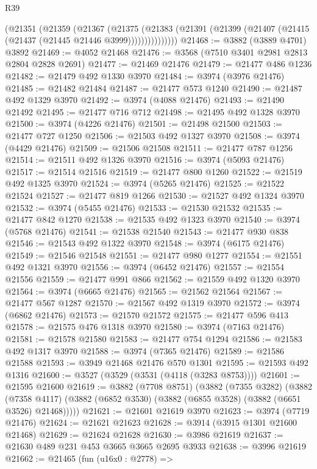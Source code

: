 \begin{lexlean}{R39}
\begin{coremodule}
            (@21351
              (@21359
                (@21367
                  (@21375
                    (@21383
                      (@21391 (@21399 (@21407 (@21415 (@21437 (@21445 @21446 @3999)))))))))))))))
@21468 := @3882 (@3889 @4701) @3892
@21469 := @4052 @21468
@21476 := @3568 (@7510 @3401 @2981 @2813 @2804 @2828 @2691)
@21477 := @21469 @21476
@21479 := @21477 @486 @1236
@21482 := @21479 @492 @1330 @3970
@21484 := @3974 (@3976 @21476)
@21485 := @21482 @21484
@21487 := @21477 @573 @1240
@21490 := @21487 @492 @1329 @3970
@21492 := @3974 (@4088 @21476)
@21493 := @21490 @21492
@21495 := @21477 @716 @712
@21498 := @21495 @492 @1328 @3970
@21500 := @3974 (@4226 @21476)
@21501 := @21498 @21500
@21503 := @21477 @727 @1250
@21506 := @21503 @492 @1327 @3970
@21508 := @3974 (@4429 @21476)
@21509 := @21506 @21508
@21511 := @21477 @787 @1256
@21514 := @21511 @492 @1326 @3970
@21516 := @3974 (@5093 @21476)
@21517 := @21514 @21516
@21519 := @21477 @800 @1260
@21522 := @21519 @492 @1325 @3970
@21524 := @3974 (@5265 @21476)
@21525 := @21522 @21524
@21527 := @21477 @819 @1266
@21530 := @21527 @492 @1324 @3970
@21532 := @3974 (@5455 @21476)
@21533 := @21530 @21532
@21535 := @21477 @842 @1270
@21538 := @21535 @492 @1323 @3970
@21540 := @3974 (@5768 @21476)
@21541 := @21538 @21540
@21543 := @21477 @930 @838
@21546 := @21543 @492 @1322 @3970
@21548 := @3974 (@6175 @21476)
@21549 := @21546 @21548
@21551 := @21477 @980 @1277
@21554 := @21551 @492 @1321 @3970
@21556 := @3974 (@6452 @21476)
@21557 := @21554 @21556
@21559 := @21477 @991 @866
@21562 := @21559 @492 @1320 @3970
@21564 := @3974 (@6665 @21476)
@21565 := @21562 @21564
@21567 := @21477 @567 @1287
@21570 := @21567 @492 @1319 @3970
@21572 := @3974 (@6862 @21476)
@21573 := @21570 @21572
@21575 := @21477 @596 @413
@21578 := @21575 @476 @1318 @3970
@21580 := @3974 (@7163 @21476)
@21581 := @21578 @21580
@21583 := @21477 @754 @1294
@21586 := @21583 @492 @1317 @3970
@21588 := @3974 (@7365 @21476)
@21589 := @21586 @21588
@21593 := @3949 @21468 @21476 @570 @1301
@21595 := @21593 @492 @1316
@21600 := @3527 (@3529 (@3531 (@4118 (@3283 @8753))))
@21601 := @21595 @21600
@21619 := @3882
    (@7708 @8751)
    (@3882
      (@7355 @3282)
      (@3882
        (@7358 @4117)
        (@3882 (@6852 @3530) (@3882 (@6855 @3528) (@3882 (@6651 @3526) @21468)))))
@21621 := @21601 @21619 @3970
@21623 := @3974 (@7719 @21476)
@21624 := @21621 @21623
@21628 := @3914 (@3915 @1301 @21600 @21468)
@21629 := @21624 @21628
@21630 := @3986 @21619
@21637 := @21630 @489 @231 @453 @3665 @3665 @2695 @3933
@21638 := @3996 @21619
@21662 := @21465
    (fun (u16x0 : @2778) =>

\end{coremodule}
\end{lexlean}
